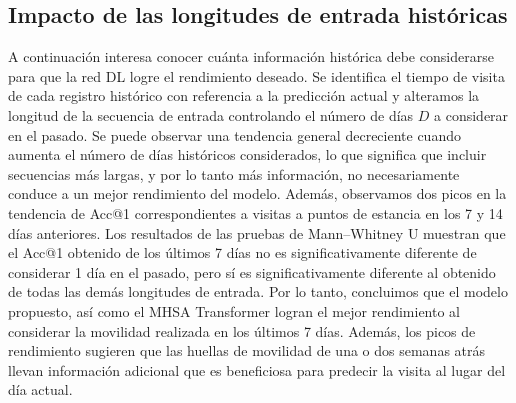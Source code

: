 \subsection{Impacto de las longitudes de entrada históricas}
A continuación interesa conocer cuánta información histórica 
debe considerarse para que la red DL logre el rendimiento deseado. 
Se identifica el tiempo de visita de cada registro histórico con 
referencia a la predicción actual y alteramos la longitud de la 
secuencia de entrada controlando el número de días $D$ a considerar 
en el pasado. Se puede 
observar una tendencia general decreciente cuando aumenta el 
número de días históricos considerados, lo que significa que 
incluir secuencias más largas, y por lo tanto más información, 
no necesariamente conduce a un mejor rendimiento del modelo. 
Además, observamos dos picos en la tendencia de Acc@1 
correspondientes a visitas a puntos de estancia en los 7 y 14 días 
anteriores. Los resultados de las pruebas de Mann–Whitney U 
muestran que el Acc@1 obtenido de los últimos 7 días no es 
significativamente diferente de considerar 1 día en el 
pasado, pero sí es significativamente 
diferente al obtenido de todas las demás longitudes de entrada. 
Por lo tanto, concluimos 
que el modelo propuesto, as\'i como el MHSA Transformer logran el mejor rendimiento 
al considerar la movilidad realizada en los últimos 7 días. 
Además, los picos de rendimiento sugieren que las huellas de 
movilidad de una o dos semanas atrás llevan información adicional 
que es beneficiosa para predecir la visita al lugar del día actual.